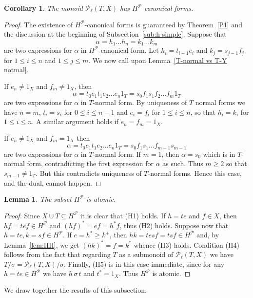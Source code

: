 \documentclass[12pt]{amsart}
\newtheorem{lem}[them]{Lemma}
\newtheorem{cor}[them]{Corollary}
\theoremstyle{definition}
\theoremstyle{definition}
\numberwithin{them}{section}
\numberwithin{equation}{section}
\begin{document}
{{\begin{cor}\label{cor:uniquenesshsim}  The monoid 
$\mathcal{P}_{\ell}(T,X)$ has $H^{\mathcal{P}}$-canonical forms.
\end{cor}
\begin{proof} 
The existence of $H^{\mathcal{P}}$-canonical forms is guaranteed by Theorem~\ref{P1} and the discussion at the beginning of 
Subsection~\ref{sub:h-simple}. 
Suppose that 
\[
\alpha=h_1\dots h_n=k_1\dots k_m\]
are two expressions for $\alpha$ in $H^{\mathcal{P}}$-canonical form.  Let $h_i=t_{i-1}e_i$ and  $k_j=s_{j-1}f_j$ for
$1\leq i\leq n$ and $1\leq j\leq m$. We now call upon Lemma~\ref{T-normal vs T-Y notmal}. 

If $e_n\neq 1_X$ and $f_m\neq 1_X$, then
\[\alpha=t_0e_1t_1e_2\dots e_n1_T=s_0f_1s_1f_2\dots f_m1_T\]
are two expressions for $\alpha$ in $T$-normal form. By uniqueness of $T$ normal forms we have $n=m$, $t_i=s_i$ for $0\leq i\leq n-1$ and $e_i=f_i$ for $1\leq i\leq n$, so that $h_i=k_i$ for $1\leq i\leq n$. A similar argument holds if $e_n=f_m=1_X$. 

If $e_n\neq 1_X$ and $f_m=1_X$ then 
\[\alpha=t_0e_1t_1e_2\dots e_n1_T=s_0f_1s_1\dots f_{m-1}s_{m-1} \]
are two expressions for $\alpha$ in $T$-normal form. If $m=1$, then $\alpha=s_0$ which is in $T$-normal form, contradicting the first expression for $\alpha$ as such. Thus $m\geq 2$ so that $s_{m-1}\neq 1_T$. But this contradicts uniqueness of $T$-normal forms. Hence this case, and the dual, cannot happen.
\end{proof}

\begin{lem}\label{prop:atomicH^P} 
The subset $H^{\mathcal{P}}$ is atomic.\end{lem}
\begin{proof} Since $X\cup T\subseteq H^{\mathcal{P}}$ it is clear that (H1) holds.  If $h=te$ and $f\in X$, then
$hf=tef\in H^{\mathcal{P}}$ and $(hf)^*=ef=h^*f$, thus (H2) holds.  Suppose now that $h=te,k=sf\in H^{\mathcal{P}}$. If $e=h^*\geq k^+$, then $hk=tesf=tsf\in H^{\mathcal{P}}$ and, by Lemma~\ref{lem:HH}, we get 
$(hk)^*=f=k^*$ whence (H3) holds. Condition (H4) follows from the fact that regarding $T$ as a submonoid of  $\mathcal{P}_{\ell}(T,X)$ we have  $T/\sigma=\mathcal{P}_{\ell}(T,X)/\sigma$. Finally, (H5) is in this case immediate, since for any $h=te\in H^{\mathcal{P}}$ we have $h\,\sigma\, t$ and $t^*=1_X$. Thus $H^{\mathcal{P}}$ is atomic. 
\end{proof}

 We draw together the results of this subsection.

}}
\end{document}

